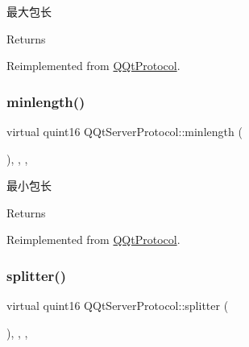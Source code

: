 最大包长 

\begin{DoxyReturn}{Returns}

\end{DoxyReturn}


Reimplemented from \mbox{\hyperlink{class_q_qt_protocol_af41bc3116abbbcfc9af45e151a253ff7}{Q\+Qt\+Protocol}}.

\mbox{\label{class_q_qt_server_protocol_aedf7e04e6c47c20e0e76f9e99a60a524}} 
\subsubsection{\texorpdfstring{minlength()}{minlength()}}
{\footnotesize\ttfamily virtual quint16 Q\+Qt\+Server\+Protocol\+::minlength (\begin{DoxyParamCaption}{ }\end{DoxyParamCaption})\hspace{0.3cm}{\ttfamily [inline]}, {\ttfamily [override]}, {\ttfamily [protected]}, {\ttfamily [virtual]}}



最小包长 

\begin{DoxyReturn}{Returns}

\end{DoxyReturn}


Reimplemented from \mbox{\hyperlink{class_q_qt_protocol_a2b00f53d3dd0eed817eeecff422891f3}{Q\+Qt\+Protocol}}.

\mbox{\label{class_q_qt_server_protocol_ad32e1371ad050b5db9ce135b8fc5d96e}} 
\subsubsection{\texorpdfstring{splitter()}{splitter()}}
{\footnotesize\ttfamily virtual quint16 Q\+Qt\+Server\+Protocol\+::splitter (\begin{DoxyParamCaption}\item[{const Q\+Byte\+Array \&}]{ }\end{DoxyParamCaption})\hspace{0.3cm}{\ttfamily [inline]}, {\ttfamily [override]}, {\ttfamily [protected]}, {\ttfamily [virtual]}}




